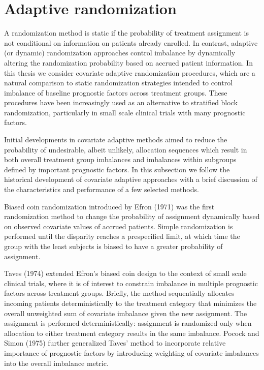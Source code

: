 \section{Adaptive randomization}

A randomization method is static if the probability of treatment assignment is not conditional on information on patients already enrolled.
In contrast, adaptive (or dynamic) randomization approaches control imbalance by dynamically altering the randomization probability based on accrued patient information.  
In this thesis we consider covariate adaptive randomization procedures, which are a natural comparison to static randomization strategies intended to control imbalance of baseline prognostic factors across treatment groups.  
These procedures have been increasingly used as an alternative to stratified block randomization, particularly in small scale clinical trials with many prognostic factors.

Initial developments in covariate adaptive methods aimed to reduce the probability of undesirable, albeit unlikely, allocation sequences which result in both overall treatment group imbalances and imbalances within subgroups defined by important prognostic factors.  
In this subsection we follow the historical development of covariate adaptive approaches with a brief discussion of the characteristics and performance of a few selected methods.

Biased coin randomization introduced by Efron (1971) was the first randomization method to change the probability of assignment dynamically based on observed covariate values of accrued patients. 
Simple randomization is performed until the disparity reaches a prespecified limit, at which time the group with the least subjects is biased to have a greater probability of assignment. 

Taves (1974) extended Efron’s biased coin design to the context of small scale clinical trials, where it is of interest to constrain imbalance in multiple prognostic factors across treatment groups. 
Briefly, the method sequentially allocates incoming patients deterministically to the treatment category that minimizes the overall unweighted sum of covariate imbalance given the new assignment. 
The assignment is performed deterministically: assignment is randomized only when allocation to either treatment category results in the same imbalance. 
Pocock and Simon (1975) further generalized Taves’ method to incorporate relative importance of prognostic factors by introducing weighting of covariate imbalances into the overall imbalance metric. 

